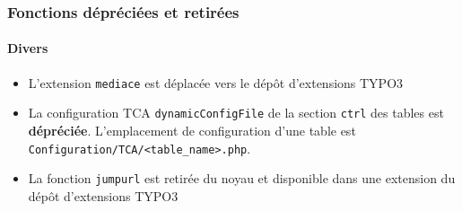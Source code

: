 
\begin{frame}[fragile]
	\frametitle{Fonctions dépréciées et retirées}
	\framesubtitle{Divers}

	\begin{itemize}

		\item L'extension \texttt{mediace} est déplacée vers le dépôt d'extensions TYPO3

		\item La configuration TCA \texttt{dynamicConfigFile} de la section \texttt{ctrl}
			des tables est \textbf{dépréciée}.
			L'emplacement de configuration d'une table est \texttt{Configuration/TCA/<table\_name>.php}.

		\item La fonction \texttt{jumpurl} est retirée du noyau et disponible dans une
			extension du dépôt d'extensions TYPO3

	\end{itemize}

\end{frame}

